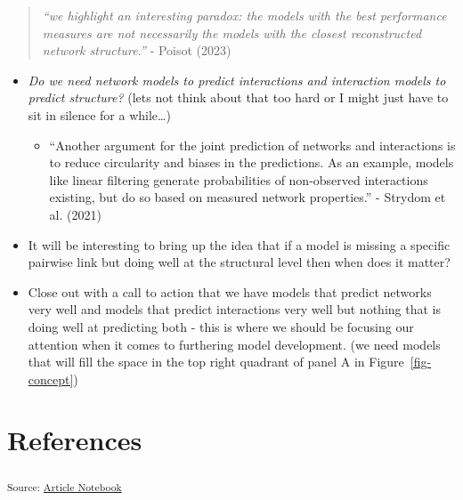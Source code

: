 \documentclass[
  letterpaper,
  DIV=11,
  numbers=noendperiod]{scrartcl}
\providecommand{\tightlist}{%
  \setlength{\itemsep}{0pt}\setlength{\parskip}{0pt}}\usepackage{longtable,booktabs,array}
\begin{document}
\begin{quote}
\emph{``we highlight an interesting paradox: the models with the best
performance measures are not necessarily the models with the closest
reconstructed network structure.''} - Poisot (2023)
\end{quote}

\begin{itemize}
\item
  \emph{Do we need network models to predict interactions and
  interaction models to predict structure?} (lets not think about that
  too hard or I might just have to sit in silence for a while\ldots)

  \begin{itemize}
  \tightlist
  \item
    ``Another argument for the joint prediction of networks and
    interactions is to reduce circularity and biases in the predictions.
    As an example, models like linear filtering generate probabilities
    of non-observed interactions existing, but do so based on measured
    network properties.'' - Strydom et al. (2021)
  \end{itemize}
\item
  It will be interesting to bring up the idea that if a model is missing
  a specific pairwise link but doing well at the structural level then
  when does it matter?
\item
  Close out with a call to action that we have models that predict
  networks very well and models that predict interactions very well but
  nothing that is doing well at predicting both - this is where we
  should be focusing our attention when it comes to furthering model
  development. (we need models that will fill the space in the top right
  quadrant of panel A in Figure~\ref{fig-concept})
\end{itemize}

\section*{References}\label{references}

\textsubscript{Source:
\href{https://BecksLab.github.io/ms_t_is_for_topology/index.qmd.html}{Article
Notebook}}
\end{document}
